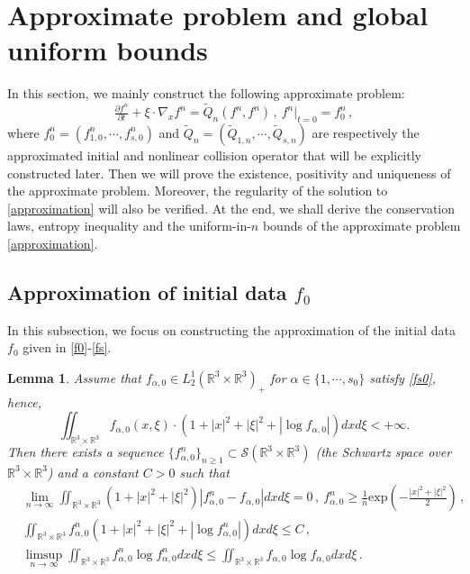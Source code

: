 \documentclass[reqno,11pt]{amsart}
\newtheorem{lemma}{Lemma}[section]
\numberwithin{equation}{section}
\def\R{\mathbb{R}}
\def\exp{\mathrm{exp}}
\begin{document}



\section{Approximate problem and global uniform bounds}\label{Sec:Apr}

In this section, we mainly construct the following approximate problem:
\begin{equation} \label{approximation}
		\tfrac{\partial f^n}{\partial t} +\xi \cdot \nabla_x f^n =\tilde{Q}_n(f^n, f^n) \,, \ f^n|_{t=0}=f^n_{0} \,,
\end{equation} 
where $f^n_{0} = ( f_{1,0}^n, \cdots, f^n_{s,0} )$ and $\tilde{Q}_n=(\tilde{Q}_{1,n},\cdots,\tilde{Q}_{s,n})$ are respectively the approximated initial and nonlinear collision operator that will be explicitly constructed later. Then we will prove the existence, positivity and uniqueness of the approximate problem. Moreover, the regularity of the solution to \eqref{approximation} will also be verified. At the end, we shall derive the conservation laws, entropy inequality and the uniform-in-$n$ bounds of the approximate problem \eqref{approximation}.

\subsection{Approximation of initial data $f_0$ }

In this subsection, we focus on constructing the approximation of the initial data $f_0$ given in \eqref{f0}-\eqref{fs}.

\begin{lemma}\label{Lemma 4.8}
	Assume that $f_{\alpha,0 } \in L^1_2 ( \R^3 \times \R^3)_+ $ for $\alpha \in \{1,\cdots ,s_0\}$ satisfy \eqref{fs0}, hence,
	\begin{equation*}
		\iint_{\R^3 \times \R^3 } f_{\alpha,0 } (x,\xi ) \cdot (1+|x|^2 +|\xi|^2 + |\log  f_{\alpha,0 } |)  dxd\xi <+ \infty .
	\end{equation*}
	Then there exists a sequence $\{f^n_{\alpha,0 }\}_{n\geq 1} \subset \mathscr{S} (\R^3 \times \R^3 )$ (the Schwartz space over $\R^3 \times \R^3$) and a constant $C > 0$ such that 
\begin{equation}\label{Ap-fs0}
  \begin{aligned}
    & \lim \limits_{n\rightarrow \infty}  \iint_{\R^3 \times \R^3 } (1+|x|^2 +|\xi|^2) |f^n_{\alpha,0 } - f_{\alpha,0 }| dxd\xi=0 \,, \ f^n_{\alpha,0 } \geq \tfrac{1}{n} \exp (- \tfrac{|x|^2+ |\xi|^2 }{2}) \,, \\
    & \iint_{\R^3 \times \R^3} f^n_{\alpha,0 }  (1+|x|^2 +|\xi|^2 + |\log f^n_{\alpha,0 }|)dxd\xi  \leq C \,, \\
    & \limsup \limits_{n\rightarrow \infty} \iint_{\R^3 \times \R^3 } f^n_{\alpha,0 } \log f^n_{\alpha,0 }  dxd\xi  \leq \iint_{\R^3 \times \R^3 } f_{\alpha,0 } \log  f_{\alpha,0 } dxd\xi \,.
  \end{aligned}
\end{equation}
\end{lemma}
\end{document}
